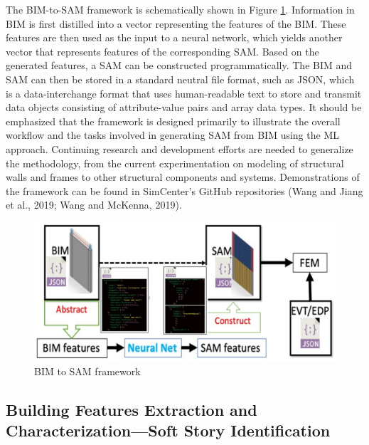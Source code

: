 The BIM-to-SAM framework is schematically shown in Figure \ref{fig:BIM_to_SAM}. Information in BIM is first distilled into a vector representing the features of the BIM. These features are then used as the input to a neural network, which yields another vector that represents features of the corresponding SAM. Based on the generated features, a SAM can be constructed programmatically. The BIM and SAM can then be stored in a standard neutral file format, such as JSON, which is a data-interchange format that uses human-readable text to store and transmit data objects consisting of attribute-value pairs and array data types. It should be emphasized that the framework is designed primarily to illustrate the overall workflow and the tasks involved in generating SAM from BIM using the ML approach. Continuing research and development efforts are needed to generalize the methodology, from the current experimentation on modeling of structural walls and frames to other structural components and systems. Demonstrations of the framework can be found in SimCenter's GitHub repositories (Wang and Jiang et al., 2019; Wang and McKenna, 2019).

\begin{figure}[htb]
    \centering
    \includegraphics[width=1.0\textwidth, angle = 0]{Figures/BIM_to_SAM.png}
    \caption{BIM to SAM framework}
    \label{fig:BIM_to_SAM}
\end{figure}

\subsection{Building Features Extraction and Characterization—Soft Story Identification}

